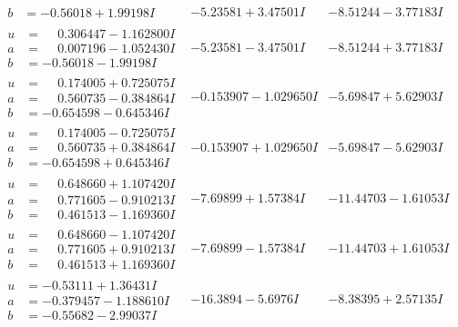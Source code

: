 \documentclass[1p]{elsarticle_modified}
\theoremstyle{definition}
\begin{document}
$$\begin{array}{c|c|c}
\begin{aligned}
b &= -0.56018 + 1.99198 I\end{aligned}
 & -5.23581 + 3.47501 I & -8.51244 - 3.77183 I \\ \hline\begin{aligned}
u &= \phantom{-}0.306447 - 1.162800 I \\
a &= \phantom{-}0.007196 - 1.052430 I \\
b &= -0.56018 - 1.99198 I\end{aligned}
 & -5.23581 - 3.47501 I & -8.51244 + 3.77183 I \\ \hline\begin{aligned}
u &= \phantom{-}0.174005 + 0.725075 I \\
a &= \phantom{-}0.560735 - 0.384864 I \\
b &= -0.654598 - 0.645346 I\end{aligned}
 & -0.153907 - 1.029650 I & -5.69847 + 5.62903 I \\ \hline\begin{aligned}
u &= \phantom{-}0.174005 - 0.725075 I \\
a &= \phantom{-}0.560735 + 0.384864 I \\
b &= -0.654598 + 0.645346 I\end{aligned}
 & -0.153907 + 1.029650 I & -5.69847 - 5.62903 I \\ \hline\begin{aligned}
u &= \phantom{-}0.648660 + 1.107420 I \\
a &= \phantom{-}0.771605 - 0.910213 I \\
b &= \phantom{-}0.461513 - 1.169360 I\end{aligned}
 & -7.69899 + 1.57384 I & -11.44703 - 1.61053 I \\ \hline\begin{aligned}
u &= \phantom{-}0.648660 - 1.107420 I \\
a &= \phantom{-}0.771605 + 0.910213 I \\
b &= \phantom{-}0.461513 + 1.169360 I\end{aligned}
 & -7.69899 - 1.57384 I & -11.44703 + 1.61053 I \\ \hline\begin{aligned}
u &= -0.53111 + 1.36431 I \\
a &= -0.379457 - 1.188610 I \\
b &= -0.55682 - 2.99037 I\end{aligned}
 & -16.3894 - 5.6976 I & -8.38395 + 2.57135 I \\ \hline\begin{aligned}

\end{aligned}
\end{array}$$
\end{document}
